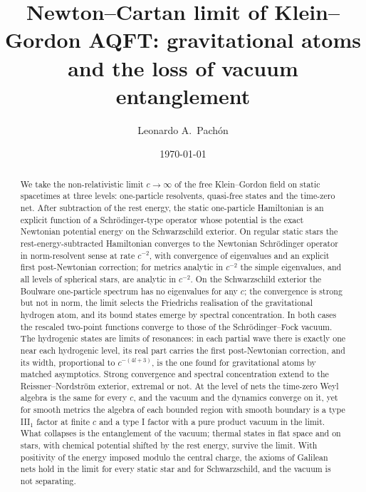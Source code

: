 \documentclass[%
 aip,
 jmp,
 amsmath,amssymb,
 reprint, onecolumn
]{revtex4-1}
\theoremstyle{definition}
\theoremstyle{remark}
\begin{document}
\preprint{}

\title{Newton--Cartan limit of Klein--Gordon AQFT: gravitational atoms
and the loss of vacuum entanglement}

\author{Leonardo A.\ Pach\'{o}n}

\date{\today}

\begin{abstract}
We take the non-relativistic limit $c\to\infty$ of the free
Klein--Gordon field on static spacetimes at three levels: one-particle
resolvents, quasi-free states and the time-zero net. After subtraction
of the rest energy, the static one-particle Hamiltonian is an explicit
function of a Schr\"odinger-type operator whose potential is the exact
Newtonian potential energy on the Schwarzschild exterior. On regular
static stars the rest-energy-subtracted Hamiltonian converges to the
Newtonian Schr\"odinger operator in norm-resolvent sense at rate
$c^{-2}$, with convergence of eigenvalues and an explicit first
post-Newtonian correction; for metrics analytic in $c^{-2}$ the simple
eigenvalues, and all levels of spherical stars, are analytic in
$c^{-2}$. On the Schwarzschild exterior the
Boulware one-particle spectrum has no eigenvalues for any $c$; the
convergence is strong but not in norm, the limit selects the Friedrichs
realisation of the gravitational hydrogen atom, and its bound states
emerge by spectral concentration. In both cases the rescaled two-point
functions converge to those of the Schr\"odinger--Fock vacuum. The
hydrogenic states are limits of resonances: in each partial wave there
is exactly one near each hydrogenic level, its real part carries the
first post-Newtonian correction, and its width, proportional to
$c^{-(4l+3)}$, is the one found for gravitational atoms by matched
asymptotics. Strong convergence and spectral concentration extend to the
Reissner--Nordstr\"om exterior, extremal or not. At the level of nets the
time-zero Weyl algebra is the same for every $c$, and the vacuum and the
dynamics converge on it, yet for smooth metrics the algebra of each
bounded region with smooth boundary is a type III$_1$ factor at finite
$c$ and a type I factor with a pure product vacuum in the limit. What
collapses is the entanglement of the vacuum; thermal states in flat space
and on stars, with chemical potential shifted by the rest energy, survive
the limit. With positivity of the energy imposed modulo the central
charge, the axioms of Galilean nets hold in the limit for every static
star and for Schwarzschild, and the vacuum is not separating.
\end{abstract}
\end{document}
